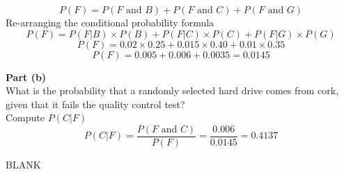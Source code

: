 \documentclass[a4paper,12pt]{article}
\begin{document}
\[P(F) = P(F \mbox{ and } B) + P(F\mbox{ and }C) + P(F\mbox{ and }G)\]
Re-arranging the conditional probability formula
\[P(F) = P(F|B)\times P(B) +  P(F|C)\times P(C) +  P(F|G)\times P(G)
\]
\[P(F) = 0.02 \times 0.25 +  0.015 \times 0.40 +  0.01 \times 0.35
\]
\[P(F) = 0.005  +  0.006  +  0.0035 = 0.0145
\]

\noindent \textbf{Part (b)}\\


\noindent What is the probability that a randomly selected hard drive comes from cork, given that it fails the quality control test?\\ 
\noindent Compute $P(C|F)$ 
\[P(C|F) = \frac{P(F\mbox{ and }C)}{P(F)} = \frac{0.006}{0.0145} = \boldsymbol{0.4137} \]

\newpage
BLANK
\end{document}
